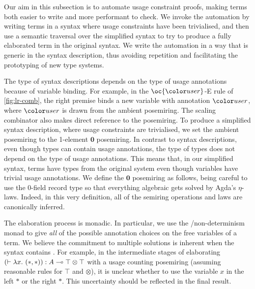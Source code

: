 Our aim in this subsection is to automate usage constraint proofs, making terms
both easier to write and more performant to check.
We invoke the automation by writing terms in a syntax where usage constraints
have been trivialised, and then use a semantic traversal over the simplified
syntax to try to produce a fully elaborated term in the original syntax.
We write the automation in a way that is generic in the syntax description, thus
avoiding repetition and facilitating the prototyping of new type systems.

The type of syntax descriptions depends on the type of usage annotations because
of variable binding.
For example, in the $\oc{\gr r}$-E rule of \cref{fig:lr-comb}, the right
premise binds a new variable with annotation $\gr r$, where $\gr r$ is drawn
from the ambient posemiring.
The scaling combinator also makes direct reference to the posemiring.
To produce a simplified syntax description, where usage constraints are
trivialised, we set the ambient posemiring to the 1-element $\mathbf0$
posemiring.
In contrast to syntax descriptions, even though types can contain usage
annotations, the type of types does not depend on the type of usage annotations.
This means that, in our simplified syntax, terms have types from the original
system even though variables have trivial usage annotations.
We define the $\mathbf0$ posemiring as follows, being careful to use the
0-field record type \AgdaRecord{$\top$} so that everything algebraic gets
solved by Agda's $\eta$-laws.
Indeed, in this very definition, all of the semiring operations and laws are
canonically inferred.


The elaboration process is monadic.
In particular, we use the /non-determinism monad to give
\emph{all} of the possible annotation choices on the free variables of a term.
We believe the commitment to multiple solutions is inherent when the syntax
contains .
For example, in the intermediate stages of elaborating
$\plr{\vdash \lambda x.~\plr{*,*}} : A \multimap \top \otimes \top$ with a
usage counting posemiring (assuming reasonable rules for $\top$ and $\otimes$),
it is unclear whether to use the variable $x$ in the left $*$ or the right $*$.
This uncertainty should be reflected in the final result.

